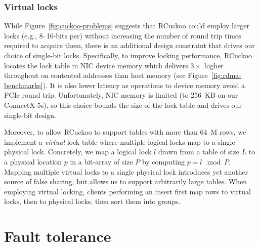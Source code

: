 \subsubsection{Virtual locks}

While Figure~\ref{fig:cuckoo-problems} suggests that RCuckoo could
employ larger locks (e.g., 8--16-bits per) without increasing the
number of round trip times required to acquire them, there is an
additional design constraint that drives our choice of single-bit
locks.  Specifically, to improve locking performance, RCuckoo locates
the lock table in NIC device memory which delivers $3\times$ higher
throughout on contented addresses than host memory (see
Figure~\ref{fig:rdma-benchmarks}). It is also lower latency as
operations to device memory avoid a PCIe round trip.  Unfortunately, NIC memory is limited (to
256~KB on our ConnectX-5s), so this choice bounds the size of the lock
table and drives our single-bit design.

Moreover, to allow RCuckoo to support tables with more than 64~M rows,
we implement a \textit{virtual} lock table where multiple logical
locks map to a single physical lock.  Concretely, we map a logical
lock $l$ drawn from a table of size $L$ to a physical location $p$ in
a bit-array of size $P$ by computing $p = l \mod P$.  Mapping multiple
virtual locks to a single physical lock introduces yet another source
of false sharing, but allows us to support arbitrarily large tables.
When employing virtual locking, clients performing an insert first map
rows to virtual locks, then to physical locks, then sort them into
groups.







\section{Fault tolerance}
\label{sec:fault-tolerance}

